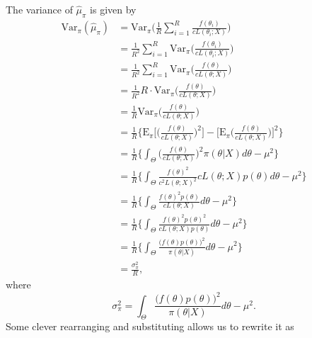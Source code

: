\documentclass[
  12pt]{article}
\begin{document}
The variance of \(\hat{\mu}_{\pi}\) is given by \[
\begin{aligned}
\text{Var}_{\pi}(\hat{\mu}_{\pi}) &= \text{Var}_{\pi}\Bigg(\frac{1}{R} \sum_{i=1}^R \frac{f(\theta_i)}{c L(\theta_i;X)}\Bigg) \\
                                  &= \frac{1}{R^2} \sum_{i=1}^R \text{Var}_{\pi}\Bigg(\frac{f(\theta_i)}{c L(\theta_i;X)}\Bigg) \\
                                  &= \frac{1}{R^2} \sum_{i=1}^R \text{Var}_{\pi}\Bigg(\frac{f(\theta)}{c L(\theta;X)}\Bigg) \\
                                  &= \frac{1}{R^2} R \cdot  \text{Var}_{\pi}\Bigg(\frac{f(\theta)}{c L(\theta;X)}\Bigg) \\
                                  &= \frac{1}{R} \text{Var}_{\pi}\Bigg(\frac{f(\theta)}{c L(\theta;X)}\Bigg) \\
                                  &= \frac{1}{R} \Bigg\{ \text{E}_{\pi}\Bigg[\bigg(\frac{f(\theta)}{c L(\theta;X)}\bigg)^2\Bigg] - \Bigg[\text{E}_{\pi}\bigg(\frac{f(\theta)}{c L(\theta;X)}\bigg)\Bigg]^2\Bigg\} \\
                                  &= \frac{1}{R} \Bigg\{ \int_{\Theta} \bigg(\frac{f(\theta)}{c L(\theta;X)}\bigg)^2 \pi(\theta | X) d\theta - \mu^2\Bigg\} \\
                                  &= \frac{1}{R} \Bigg\{ \int_{\Theta} \frac{f(\theta)^2}{c^2L(\theta;X)^2} cL(\theta;X)p(\theta) d\theta - \mu^2\Bigg\} \\
                                  &= \frac{1}{R} \Bigg\{ \int_{\Theta} \frac{f(\theta)^2 p(\theta)}{cL(\theta;X)} d\theta - \mu^2\Bigg\} \\
                                  &= \frac{1}{R} \Bigg\{ \int_{\Theta} \frac{f(\theta)^2 p(\theta)^2}{cL(\theta;X)p(\theta)} d\theta - \mu^2\Bigg\} \\
                                  &= \frac{1}{R} \Bigg\{ \int_{\Theta} \frac{\big(f(\theta) p(\theta)\big)^2}{\pi(\theta | X)} d\theta - \mu^2\Bigg\} \\
                                  &= \frac{\sigma_{\pi}^2}{R},
\end{aligned}
\] where \[
\sigma_{\pi}^2 = \int_{\Theta} \frac{\big(f(\theta) p(\theta)\big)^2}{\pi(\theta | X)} d\theta - \mu^2.
\] Some clever rearranging and substituting allows us to rewrite it as
\end{document}
